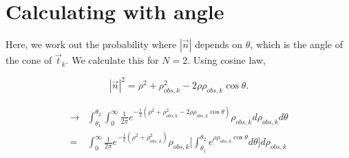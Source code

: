 \documentclass[12pt]{article}
\newcommand{\tjtk}{(\vec{t}_j\cdot\vec{t}_k)}
\begin{document}
\begin{comment}
Using Stirling's approximation $n! \approx \sqrt{2\pi n} (n/e)^n$:

   \begin{align}
   =& \Big\{ {2\pi N}^{1/2}{\Big(\frac{N}{e}\Big)}^N  \Big\} 
      \Big\{ {2\pi\frac{N}{\tjtk+1}}^{-\frac{1}{2}} \Big(\frac{N}{\tjtk+1}\frac{1}{e}\Big)^{-\frac{N}{\tjtk+1}}  \Big\} \\
   \notag & \qquad 
      \Big\{ {2\pi\frac{N\tjtk}{\tjtk+1}}^{-\frac{1}{2}} \Big(\frac{N\tjtk}{\tjtk+1}\frac{1}{e}\Big)^{-\frac{N\tjtk}{\tjtk+1}} \Big\} \tjtk^{-\frac{N}{\tjtk+1}}\\
   =& \frac{(\tjtk+1)^{N+1}}{\sqrt{2\pi N}} (\tjtk)^{-\frac{N\tjtk}{\tjtk+1}-\frac{1}{2}} (\tjtk)^{-\frac{N}{\tjtk+1}} \\
   =& \frac{(\tjtk+1)^{N+1}}{\sqrt{2\pi N}} (\tjtk)^{-\frac{1}{2}} (\tjtk)^{-\frac{N\tjtk -N}{\tjtk+1}}\\
   =& \frac{(\tjtk+1)^{N+1}}{\sqrt{2\pi N \tjtk}} (\tjtk)^{-N}\\
   \approx& \frac{(\tjtk+1)^{N}}{\tjtk} \frac{1}{\sqrt{2\pi N \tjtk}}
   \end{align}
Then:
   \begin{equation}
   \max\Big( \binom{N-1}{n} (\tjtk)^{-n}\Big) \approx \frac{(\tjtk+1)^N}{\sqrt{2\pi(\tjtk)^{3}N}}
   \end{equation}
\end{comment}

\section{Calculating with angle}\label{section:angle}

Here, we work out the probability where $|\vec n|$ depends on $\theta$, which is the angle of the cone of $\vec t_k$. We calculate this for $N=2$. Using cosine law,

	\begin{equation}
	|\vec n|^2 = \rho^2 + \rho^2_{obs,k} - 2\rho\rho_{obs,k}\cos\theta.
	\end{equation}
	
	\begin{align}
	\rightarrow& \int_{\theta_1}^{\theta_2} \int_{0}^{\infty} \frac{1}{2\pi} e^{-\frac{1}{2}(\rho^2 + \rho^2_{obs,k} - 2\rho\rho_{obs,k}\cos\theta)} \rho_{obs,k} d\rho_{obs,k} d\theta \\
	=& \int_{0}^{\infty} \frac{1}{2\pi} e^{-\frac{1}{2}(\rho^2 + \rho^2_{obs,k})}\rho_{obs,k} \Big[\int_{\theta_1}^{\theta_2}e^{\rho\rho_{obs,k}\cos\theta}d\theta \Big]d\rho_{obs,k}
	\end{align}
\end{document}
